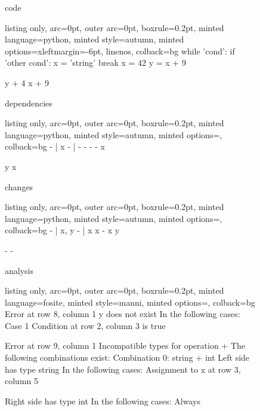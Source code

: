 \begin{figure}[!h]
 \begin{minipage}{0.32\textwidth}
 code
 \vspace{2pt}
  \begin{tcblisting}{listing only, 
    arc=0pt,
    outer arc=0pt, 
    boxrule=0.2pt,
    minted language=python,
    minted style=autumn,
    minted options={xleftmargin=-6pt, linenos},
    colback=bg }
while 'cond':
  if 'other cond':
    x = 'string'
    break
  x = 42
  y = x + 9
  
y + 4
x + 9
\end{tcblisting}
 \end{minipage}
 \begin{minipage}{0.32\textwidth}
 dependencies
  \begin{tcblisting}{listing only, 
    arc=0pt,
    outer arc=0pt, 
    boxrule=0.2pt,
    minted language=python,
    minted style=autumn,
    minted options={},
    colback=bg }
- | x
    - | -
        -
        -
    -
    x

y
x
\end{tcblisting}
 \end{minipage}
 \begin{minipage}{0.32\textwidth}
 changes
  \begin{tcblisting}{listing only, 
    arc=0pt,
    outer arc=0pt, 
    boxrule=0.2pt,
    minted language=python,
    minted style=autumn,
    minted options={},
    colback=bg }
- | x, y
    - | x
        x
        -
    x
    y

-
-
\end{tcblisting}
 \end{minipage}
 \begin{minipage}{\textwidth}
 \vspace{4pt}
 analysis
  \begin{tcblisting}{listing only, 
    arc=0pt,
    outer arc=0pt, 
    boxrule=0.2pt,
    minted language=fosite,
    minted style=manni,
    minted options={},
    colback=bg }
Error at row 8, column 1
  y does not exist
  In the following cases:
  Case 1
    Condition at row 2, column 3 is true
    
Error at row 9, column 1
  Incompatible types for operation +
  The following combinations exist:
  Combination 0: string + int
    Left side has type string
    In the following cases:
      Assignment to x at row 3, column 5

    Right side has type int
    In the following cases:
      Always
\end{tcblisting}
 \end{minipage}
 \label{lst:break1}
\end{figure}